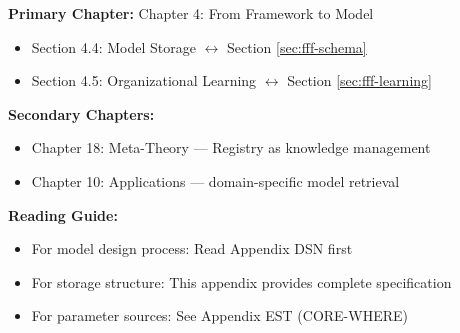 %
%

%
%
%
%

\begin{tcolorbox}[colback=purple!5!white, colframe=purple!75!black,
    title=Chapter Linkage]

\textbf{Primary Chapter:} Chapter 4: From Framework to Model
\begin{itemize}[nosep]
\item Section 4.4: Model Storage $\leftrightarrow$ Section \ref{sec:fff-schema}
\item Section 4.5: Organizational Learning $\leftrightarrow$ Section \ref{sec:fff-learning}
\end{itemize}

\textbf{Secondary Chapters:}
\begin{itemize}[nosep]
\item Chapter 18: Meta-Theory --- Registry as knowledge management
\item Chapter 10: Applications --- domain-specific model retrieval
\end{itemize}

\textbf{Reading Guide:}
\begin{itemize}[nosep]
\item For model design process: Read Appendix DSN first
\item For storage structure: This appendix provides complete specification
\item For parameter sources: See Appendix EST (CORE-WHERE)
\end{itemize}

\end{tcolorbox}

